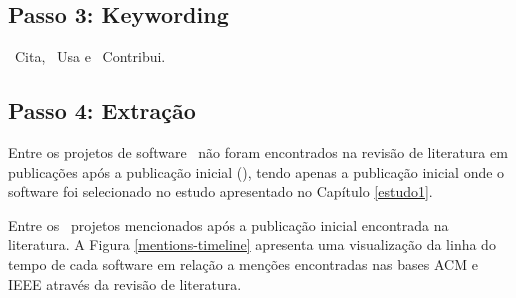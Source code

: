 
\subsection{Passo 3: Keywording}

\CiteCount \ Cita,
\UseCount \ Usa e
\ContributeCount \ Contribui.

\subsection{Passo 4: Extração}

Entre os projetos de software
\SoftwareNotMentionedCount \ não foram encontrados na revisão de literatura em
publicações após a publicação inicial
(), tendo apenas a publicação
inicial onde o software foi selecionado no estudo apresentado no Capítulo
\ref{estudo1}.



Entre os \MentionsStudyDois \
projetos mencionados após a publicação inicial encontrada na literatura.
A Figura \ref{mentions-timeline} apresenta uma visualização da linha do tempo
de cada software em relação a menções encontradas nas bases ACM e IEEE através
da revisão de literatura.

